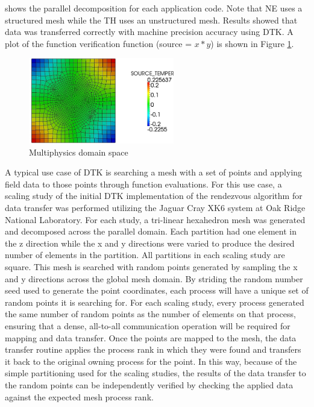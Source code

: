 \documentclass{mc2013}
\begin{document}
 shows the parallel decomposition for each application code.  Note
 that NE uses a structured mesh while the TH uses an unstructured
 mesh.  Results showed that data was transferred correctly with
 machine precision accuracy using DTK.  A plot of the function
 verification function (source = $x*y$) is shown in Figure
 \ref{fig:verification_solution}.
\begin{figure}[ht!]
  \centering \includegraphics[width=2.5in]{cfd_transferred_field.png}
  \caption{Multiphysics domain space}
  \label{fig:verification_solution}
\end{figure}

\label{subsec:cfd_neutronics}


\label{sec:scaling_study}

A typical use case of DTK is searching a mesh with a set of points and
applying field data to those points through function evaluations. For
this use case, a scaling study of the initial DTK implementation of
the rendezvous algorithm for data transfer was performed utilizing the
Jaguar Cray XK6 system at Oak Ridge National Laboratory. For each
study, a tri-linear hexahedron mesh was generated and decomposed
across the parallel domain. Each partition had one element in the z
direction while the x and y directions were varied to produce the
desired number of elements in the partition. All partitions in each
scaling study are square. This mesh is searched with random points
generated by sampling the x and y directions across the global mesh
domain.  By striding the random number seed used to generate the point
coordinates, each process will have a unique set of random points it
is searching for. For each scaling study, every process generated the
same number of random points as the number of elements on that
process, ensuring that a dense, all-to-all communication operation
will be required for mapping and data transfer. Once the points are
mapped to the mesh, the data transfer routine applies the process rank
in which they were found and transfers it back to the original owning
process for the point. In this way, because of the simple partitioning
used for the scaling studies, the results of the data transfer to the
random points can be independently verified by checking the applied
data against the expected mesh process rank.
\end{document}
